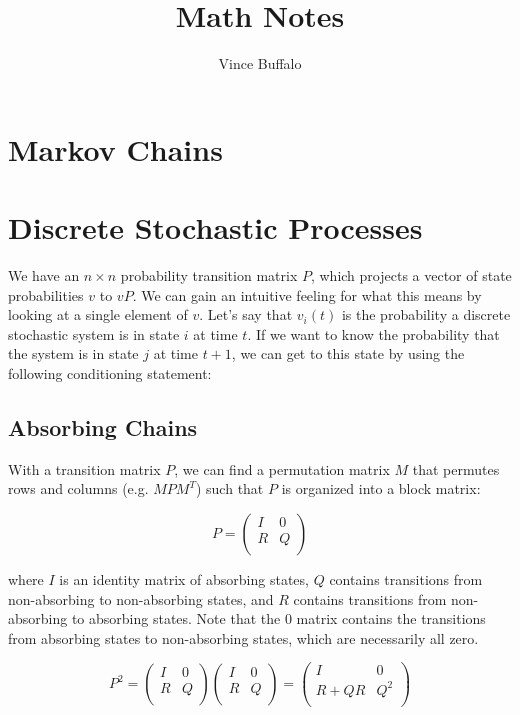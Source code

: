 \documentclass[11pt]{article}
\title{Math Notes}
\author{Vince Buffalo}
\begin{document}
\maketitle

\section{Markov Chains}

\section{Discrete Stochastic Processes}

We have an $n \times n$ probability transition matrix $P$, which projects a
vector of state probabilities $v$ to $vP$. We can gain an intuitive feeling for
what this means by looking at a single element of $v$. Let's say that $v_i(t)$
is the probability a discrete stochastic system is in state $i$ at time $t$. If
we want to know the probability that the system is in state $j$ at time $t +
1$, we can get to this state by using the following conditioning statement:


\subsection{Absorbing Chains}

With a transition matrix $P$, we can find a permutation matrix $M$ that
permutes rows and columns (e.g. $M P M^T$) such that $P$ is organized into a
block matrix:

$$
P = \begin{pmatrix}
  I & 0 \\
  R & Q \\
\end{pmatrix}
$$

where $I$ is an identity matrix of absorbing states, $Q$ contains transitions
from non-absorbing to non-absorbing states, and $R$ contains transitions from
non-absorbing to absorbing states. Note that the $0$ matrix contains the
transitions from absorbing states to non-absorbing states, which are
necessarily all zero.

$$
P^2 = \begin{pmatrix}
  I & 0 \\
  R & Q \\
\end{pmatrix}
\begin{pmatrix}
  I & 0 \\
  R & Q \\
\end{pmatrix} = 
\begin{pmatrix}
  I & 0 \\
  R + QR & Q^2\\
\end{pmatrix}
$$
\end{document}
